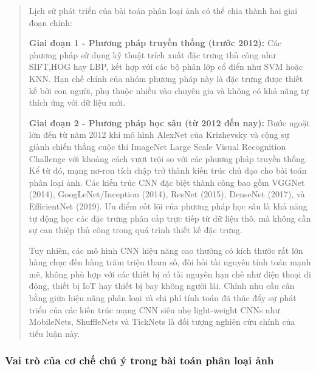 \documentclass[
]{article}
\begin{document}
\begin{quote}
Lịch sử phát triển của bài toán phân loại ảnh có thể chia thành hai giai
đoạn chính:

\textbf{Giai đoạn 1 - Phương pháp truyền thống (trước 2012):} Các phương
pháp sử dụng kỹ thuật trích xuất đặc trưng thủ công như SIFT,HOG hay
LBP, kết hợp với các bộ phân lớp cổ điển như SVM hoặc KNN. Hạn chế chính
của nhóm phương pháp này là đặc trưng được thiết kế bởi con người, phụ
thuộc nhiều vào chuyên gia và không có khả năng tự thích ứng với dữ liệu
mới.

\textbf{Giai đoạn 2 - Phương pháp học sâu (từ 2012 đến nay):} Bước ngoặt
lớn đến từ năm 2012 khi mô hình AlexNet của Krizhevsky và cộng sự giành
chiến thắng cuộc thi ImageNet Large Scale Visual Recognition Challenge
với khoảng cách vượt trội so với các phương pháp truyền thống. Kể từ đó,
mạng nơ-ron tích chập trở thành kiến trúc chủ đạo cho bài toán phân loại
ảnh. Các kiến trúc CNN đặc biệt thành công bao gồm VGGNet (2014),
GoogLeNet/Inception (2014), ResNet (2015), DenseNet (2017), và
EfficientNet (2019). Ưu điểm cốt lõi của phương pháp học sâu là khả năng
tự động học các đặc trưng phân cấp trực tiếp từ dữ liệu thô, mà không
cần sự can thiệp thủ công trong quá trình thiết kế đặc trưng.

Tuy nhiên, các mô hình CNN hiệu năng cao thường có kích thước rất lớn
hàng chục đến hàng trăm triệu tham số, đòi hỏi tài nguyên tính toán mạnh
mẽ, không phù hợp với các thiết bị có tài nguyên hạn chế như điện thoại
di động, thiết bị IoT hay thiết bị bay không người lái. Chính nhu cầu
cân bằng giữa hiệu năng phân loại và chi phí tính toán đã thúc đẩy sự
phát triển của các kiến trúc mạng CNN siêu nhẹ light-weight CNNs như
MobileNets, ShuffleNets và TickNets là đối tượng nghiên cứu chính của
tiểu luận này.
\end{quote}

\hypertarget{vai-truxf2-cux1ee7a-cux1a1-chux1ebf-chuxfa-uxfd-trong-buxe0i-touxe1n-phuxe2n-loux1ea1i-ux1ea3nh}{%
\subsubsection{Vai trò của cơ chế chú ý trong bài toán phân loại
ảnh}\label{vai-truxf2-cux1ee7a-cux1a1-chux1ebf-chuxfa-uxfd-trong-buxe0i-touxe1n-phuxe2n-loux1ea1i-ux1ea3nh}}
\end{document}
